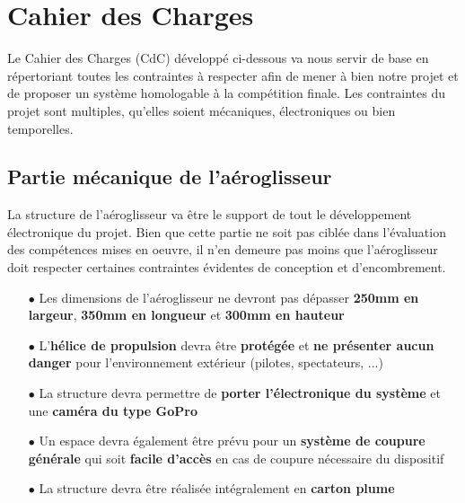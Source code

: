 \documentclass[a4paper,12pt]{report}
\begin{document}
	\vspace{-1em}
	
	\section{Cahier des Charges}
	
	\vspace{-1em}
	
	Le Cahier des Charges (CdC) développé ci-dessous va nous servir de base en répertoriant toutes les contraintes à respecter afin de mener à bien notre projet et de proposer un système homologable à la compétition finale. Les contraintes du projet sont multiples, qu'elles soient mécaniques, électroniques ou bien temporelles.
	
	\vspace{-1em}
	
		\subsection{Partie mécanique de l'aéroglisseur}
		
		\vspace{-1em}
		
		La structure de l'aéroglisseur va être le support de tout le développement électronique du projet. Bien que cette partie ne soit pas ciblée dans l'évaluation des compétences mises en oeuvre, il n'en demeure pas moins que l'aéroglisseur doit respecter certaines contraintes évidentes de conception et d'encombrement.
		
		\begin{itemize}
			\item[$\bullet$] Les dimensions de l'aéroglisseur ne devront pas dépasser \textbf{250mm en largeur}, \textbf{350mm en longueur} et \textbf{300mm en hauteur}
			\item[$\bullet$] L'\textbf{hélice de propulsion} devra être \textbf{protégée} et \textbf{ne présenter aucun danger} pour l'environnement extérieur (pilotes, spectateurs, ...)
			\item[$\bullet$] La structure devra permettre de \textbf{porter l'électronique du système} et une \textbf{caméra du type GoPro}
			\item[$\bullet$] Un espace devra également être prévu pour un \textbf{système de coupure générale} qui soit \textbf{facile d'accès} en cas de coupure nécessaire du dispositif
			\item[$\bullet$] La structure devra être réalisée intégralement en \textbf{carton plume}
		\end{itemize}
		
\end{document}
